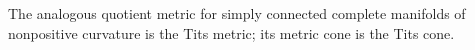 \begin{remark}
\label{rem:chow-iii-i55-tits-metric}
The analogous quotient metric for simply connected complete manifolds of
nonpositive curvature is the Tits metric; its metric cone is the Tits cone.
\end{remark}
